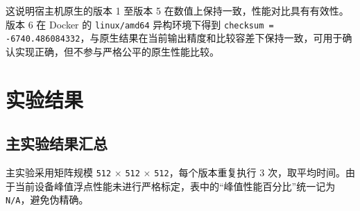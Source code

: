 \documentclass[UTF8,a4paper,12pt]{ctexart}
\begin{document}
这说明宿主机原生的版本 1 至版本 5 在数值上保持一致，性能对比具有有效性。版本 6 在 Docker 的 \texttt{linux/amd64} 异构环境下得到 \texttt{checksum = -6740.486084332}，与原生结果在当前输出精度和比较容差下保持一致，可用于确认实现正确，但不参与严格公平的原生性能比较。

\section{实验结果}

\subsection{主实验结果汇总}

主实验采用矩阵规模 \texttt{512} $\times$ \texttt{512} $\times$ \texttt{512}，每个版本重复执行 3 次，取平均时间。由于当前设备峰值浮点性能未进行严格标定，表中的“峰值性能百分比”统一记为 \texttt{N/A}，避免伪精确。
\end{document}

